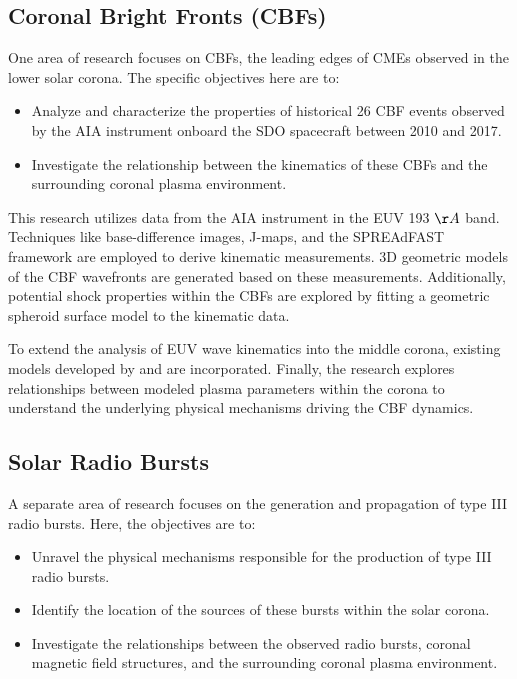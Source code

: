 \subsection*{Coronal Bright Fronts (CBFs)}
One area of research focuses on CBFs, the leading edges of CMEs observed in the lower solar corona. The specific objectives here are to:

\begin{itemize}
	\item Analyze and characterize the properties of historical 26 CBF events observed by the AIA instrument onboard the SDO spacecraft between 2010 and 2017.
	\item Investigate the relationship between the kinematics of these CBFs and the surrounding coronal plasma environment.
\end{itemize}

This research utilizes data from the AIA instrument in the EUV 193 $\AA$ band. Techniques like base-difference images, J-maps, and the SPREAdFAST framework are employed to derive kinematic measurements. 3D geometric models of the CBF wavefronts are generated based on these measurements. Additionally, potential shock properties within the CBFs are explored by fitting a geometric spheroid surface model to the kinematic data. 

To extend the analysis of EUV wave kinematics into the middle corona, existing models developed by \citet{byrne_2013} and \citet{gallagher_2003} are incorporated. Finally, the research explores relationships between modeled plasma parameters within the corona to understand the underlying physical mechanisms driving the CBF dynamics.

\subsection*{Solar Radio Bursts}
A separate area of research focuses on the generation and propagation of type III radio bursts. Here, the objectives are to:

\begin{itemize}
	\item Unravel the physical mechanisms responsible for the production of type III radio bursts.
	\item Identify the location of the sources of these bursts within the solar corona.
	\item Investigate the relationships between the observed radio bursts, coronal magnetic field structures, and the surrounding coronal plasma environment.
\end{itemize}

